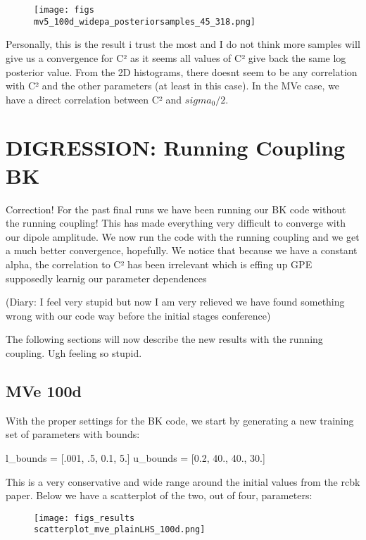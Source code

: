 \documentclass{article}
\begin{document}
\begin{figure}
\centering
\texttt{[image: figs\\mv5\_100d\_widepa\_posteriorsamples\_45\_318.png]}
\label{fig:mv5_100d_widepa_posteriorsamples_45_318}
\end{figure}

Personally, this is the result i trust the most and I do not think more samples will give us a convergence for C² as it seems all values of C² give back the same log posterior value. From the 2D histograms, there doesnt seem to be any correlation with C² and the other parameters (at least in this case). In the MVe case, we have a direct correlation between C² and $sigma_0/2$.

\section{DIGRESSION: Running Coupling BK}

Correction! For the past final runs we have been running our BK code without the running coupling! This has made everything very difficult to converge with our dipole amplitude. We now run the code with the running coupling and we get a much better convergence, hopefully. We notice that because we have a constant alpha, the correlation to C² has been irrelevant which is effing up GPE supposedly learnig our parameter dependences

(Diary: I feel very stupid but now I am very relieved we have found something wrong with our code way before the initial stages conference)

The following sections will now describe the new results with the running coupling. Ugh feeling so stupid. 

\subsection{MVe 100d}
With the proper settings for the BK code, we start by generating a new training set of parameters with bounds: 

l_bounds = [.001, .5, 0.1, 5.] 
u_bounds = [0.2, 40., 40., 30.]

This is a very conservative and wide range around the initial values from the rcbk paper. Below we have a scatterplot of the two, out of four, parameters:

\begin{figure}
\centering
\texttt{[image: figs\_results\\scatterplot\_mve\_plainLHS\_100d.png]}
\label{fig:scatterplot_mve_plainLHS_100d}
\end{figure}
\end{document}
